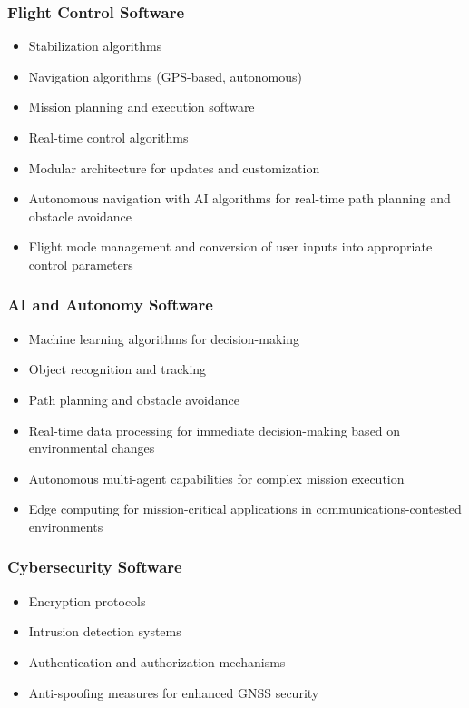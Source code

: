 \subsubsection{Flight Control Software}
\begin{itemize}
\item Stabilization algorithms
\item Navigation algorithms (GPS-based, autonomous)
\item Mission planning and execution software
\item Real-time control algorithms
\item Modular architecture for updates and customization
\item Autonomous navigation with AI algorithms for real-time path planning and obstacle avoidance
\item Flight mode management and conversion of user inputs into appropriate control parameters
\end{itemize}

\subsubsection{AI and Autonomy Software}
\begin{itemize}
\item Machine learning algorithms for decision-making
\item Object recognition and tracking
\item Path planning and obstacle avoidance
\item Real-time data processing for immediate decision-making based on environmental changes
\item Autonomous multi-agent capabilities for complex mission execution
\item Edge computing for mission-critical applications in communications-contested environments
\end{itemize}

\subsubsection{Cybersecurity Software}
\begin{itemize}
\item Encryption protocols
\item Intrusion detection systems
\item Authentication and authorization mechanisms
\item Anti-spoofing measures for enhanced GNSS security
\end{itemize}

